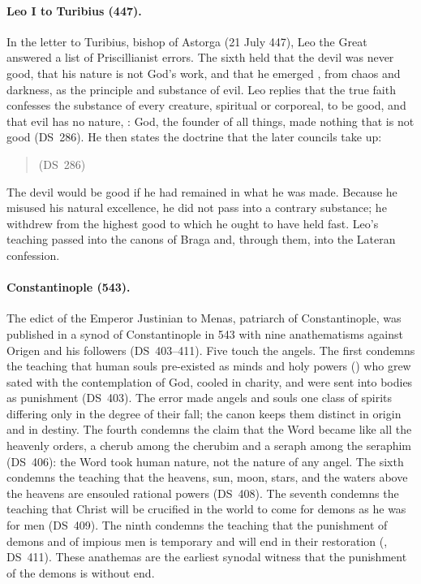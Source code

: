 \paragraph{Leo I to Turibius (447).} In the letter 
to Turibius, bishop of Astorga (21 July 447), Leo the Great answered a list
of Priscillianist errors. The sixth held that the devil was never good,
that his nature is not God's work, and that he emerged , from chaos and darkness, as the principle and substance of evil.
Leo replies that the true faith confesses the substance of every creature,
spiritual or corporeal, to be good, and that evil has no nature, : God, the
founder of all things, made nothing that is not good (DS~286). He then states the
doctrine that the later councils take up:
\begin{quote}
 (DS~286)
\end{quote}
The devil would be good if he had remained in what he was made. Because he
misused his natural excellence, he did not pass into a contrary substance;
he withdrew from the highest good to which he ought to have held fast. Leo's
teaching passed into the canons of Braga and, through them, into the
Lateran confession.

\paragraph{Constantinople (543).} The edict of the Emperor Justinian to
Menas, patriarch of Constantinople, was published in a synod of
Constantinople in 543 with nine anathematisms against Origen and his
followers (DS~403--411). Five touch the angels. The first condemns the teaching that human souls
pre-existed as minds and holy powers () who grew sated with the contemplation of God, cooled in charity,
and were sent into bodies as punishment (DS~403). The error made angels and
souls one class of spirits differing only in the degree of their fall; the
canon keeps them distinct in origin and in destiny. The fourth condemns the
claim that the Word became like all the heavenly orders, a cherub among the
cherubim and a seraph among the seraphim (DS~406): the Word took human
nature, not the nature of any angel. The sixth condemns the teaching that
the heavens, sun, moon, stars, and the waters above the heavens are
ensouled rational powers (DS~408). The seventh condemns the teaching that
Christ will be crucified in the world to come for demons as he was for men
(DS~409). The ninth condemns the teaching that the punishment of demons and
of impious men is temporary and will end in their restoration
(, DS~411). These anathemas are
the earliest synodal witness that the punishment of the demons is without
end.

